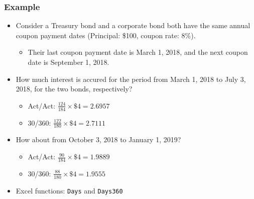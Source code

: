\documentclass[10pt]{beamer}
\begin{document}
	\begin{frame}
		\frametitle{Example}
		
		\begin{itemize}
			\item Consider a Treasury bond and a corporate bond both have the same annual coupon payment dates (Principal: \$100, coupon rate: 8\%).
			
			\begin{itemize}
				\item Their last coupon payment date is March 1, 2018, and the next coupon date is September 1, 2018.
			\end{itemize}		
			
			\item How much interest is accured for the period from March 1, 2018 to July 3, 2018, for the two bonds, respectively?
			
			\begin{itemize}
				\item Act/Act: $ \frac{124}{184} \times \$4 =2.6957 $ \vspace{5pt}
				\item 30/360: $ \frac{122}{180} \times \$4 =2.7111 $ 
			\end{itemize}
			
			\item How about from October 3, 2018 to January 1, 2019?
			
			\begin{itemize}
				\item Act/Act: $ \frac{90}{184} \times \$4 =1.9889 $ \vspace{5pt}
				\item 30/360: $ \frac{88}{180} \times \$4 =1.9555 $ \vspace{5pt}
			\end{itemize}	
		
			
			\item Excel functions: \texttt{Days} and \texttt{Days360}	
			
		\end{itemize}		
		
	\end{frame}
	
	
	
\end{document}
